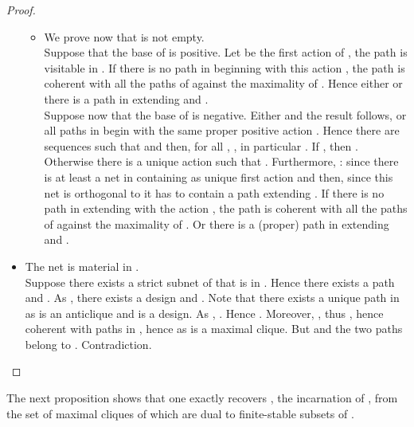 \documentclass{LMCS}
\begin{document}
\begin{proof}
\begin{itemize}
\begin{itemize}
\item We prove now that  is not empty.\\
Suppose that the base of  is positive. Let  be the first action of , the path  is visitable in .
If there is no path in  beginning with this action , the path  is coherent with all the paths of  against the maximality of . 
Hence either  or  there is a  path  in  extending  and . \\
 Suppose now that the base of  is negative.
 Either  and the result follows, or all paths in  begin with the same proper positive action . 
Hence there are sequences  such that  and then, for all , , in particular . 
If , then . 
Otherwise there is a unique action  such that . Furthermore, : since  there is at least a net in  containing  as unique first action and then, since this net is orthogonal to  it has to contain a path extending . 
If there is no path in   extending   with the action , the path  is coherent with all the paths of  against the maximality of . Or there is a (proper) path  in  extending  and . 
\end{itemize}

 
\item The net  is material in .\\
Suppose there exists a strict subnet  of  that is in . Hence there exists a path  and . As , there exists a design  and . Note that there exists a unique path in  as  is an anticlique and  is a design. As , .
Hence . Moreover, , thus , hence coherent with paths in , hence  as  is a maximal clique. But  and the two paths belong to . Contradiction.\qedhere
\end{itemize}
\end{proof}

The next proposition shows that one exactly recovers , the incarnation of , from the set of maximal cliques of  which are dual to finite-stable subsets of .
\end{document}
